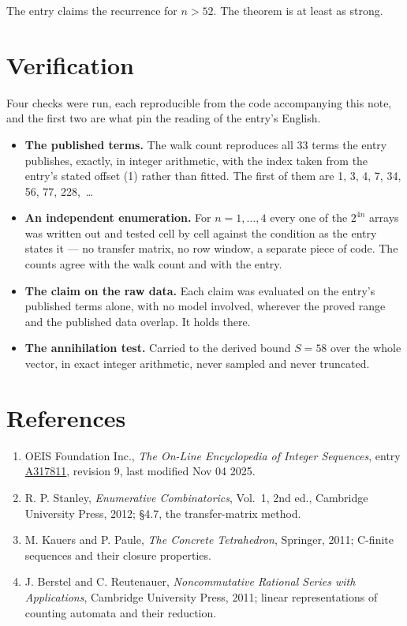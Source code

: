 \documentclass[11pt]{article}
\theoremstyle{definition}
\begin{document}
The entry claims the recurrence for $n > 52$. The theorem is at least as strong.

\section{Verification}

Four checks were run, each reproducible from the code accompanying this note, and the first two are what pin the reading of the entry's English.

\begin{itemize}

\item {\bfseries The published terms.} The walk count reproduces all 33 terms the entry publishes, exactly, in integer arithmetic, with the index taken from the entry's stated offset (1) rather than fitted. The first of them are 1, 3, 4, 7, 34, 56, 77, 228,~\dots

\item {\bfseries An independent enumeration.} For $n = 1,\dots,4$ every one of the $2^{4n}$ arrays was written out and tested cell by cell against the condition as the entry states it --- no transfer matrix, no row window, a separate piece of code. The counts agree with the walk count and with the entry.

\item {\bfseries The claim on the raw data.} Each claim was evaluated on the entry's published terms alone, with no model involved, wherever the proved range and the published data overlap. It holds there.

\item {\bfseries The annihilation test.} Carried to the derived bound $S = 58$ over the whole vector, in exact integer arithmetic, never sampled and never truncated.

\end{itemize}

\section{References}

\begin{enumerate}

\item OEIS Foundation Inc., \emph{The On-Line Encyclopedia of Integer Sequences}, entry \href{https://oeis.org/A317811}{A317811}, revision 9, last modified Nov 04 2025.

\item R. P. Stanley, \emph{Enumerative Combinatorics}, Vol.~1, 2nd ed., Cambridge University Press, 2012; \S4.7, the transfer-matrix method.

\item M. Kauers and P. Paule, \emph{The Concrete Tetrahedron}, Springer, 2011; C-finite sequences and their closure properties.

\item J. Berstel and C. Reutenauer, \emph{Noncommutative Rational Series with Applications}, Cambridge University Press, 2011; linear representations of counting automata and their reduction.

\end{enumerate}
\end{document}

